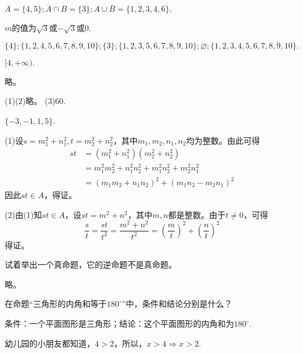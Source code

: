 \documentclass[lang=cn,newtx,10pt,scheme=chinese]{elegantbook}
\begin{document}
\begin{exercise}
  $\overline{A}=\{4,5\};\overline{A}\cap B=\{3\};A\cup\overline{B}=\{1,2,3,4,6\}.$
\end{exercise}
\begin{exercise}
  $m$的值为$\sqrt{3}$或$-\sqrt{3}$或$0$.
\end{exercise}
\begin{exercise}
  $\{4\};\{1,2,4,5,6,7,8,9,10\};\{3\};\{1,2,3,5,6,7,8,9,10\};\varnothing ;\{1,2,3,4,5,6,7,8,9,10\}.$
\end{exercise}
\begin{exercise}
  $[4,+\infty).$
\end{exercise}
\begin{exercise}
  略。
\end{exercise}
\begin{exercise}
  (1)(2)略。
  (3)60.
\end{exercise}
\begin{exercise}
  $\{-3,-1,1,5\}$.
\end{exercise}
\begin{exercise}
  (1)设$s=m_1^2+n_1^2,t=m_2^2+n_2^2$，其中$m_1,m_2,n_1,n_2$均为整数。由此可得
  $$\begin{aligned}
    st& =(m_1^2+n_1^2)(m_2^2+n_2^2)  \\
    &=m_1^2m_2^2+n_1^2n_2^2+m_1^2n_2^2+m_2^2n_1^2 \\
    &=(m_1m_2+n_1n_2)^2+(m_1n_2-m_2n_1)^2
    \end{aligned}$$
  因此$st\in A$，得证。
  
  (2)由(1)知$st \in A$，设$st=m^2+n^2$，其中$m,n$都是整数。由于$t\neq 0$，可得$$\frac st=\frac{st}{t^2}=\frac{m^2+n^2}{t^2}=\left(\frac mt\right)^2+\left(\frac nt\right)^2$$
  得证。
\end{exercise}
\begin{exercise}\label{exer:202405021028}
  试着举出一个真命题，它的逆命题不是真命题。
\end{exercise}
\begin{solution}
  略。
\end{solution}
\begin{exercise}
  在命题“三角形的内角和等于$180^{\circ}$”中，条件和结论分别是什么？
\end{exercise}
\begin{solution}
  条件：一个平面图形是三角形；结论：这个平面图形的内角和为$180^{\circ}$.
\end{solution}
\begin{example}\label{exp:202406231441}
  幼儿园的小朋友都知道，$4>2$，所以，$x>4\Rightarrow x>2$.
\end{example}
\end{document}
